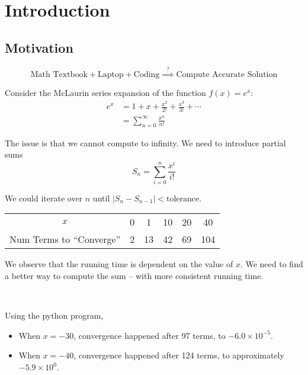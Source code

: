 \chapter{Introduction}

\section{Motivation}

\[
    \text{Math Textbook} + \text{Laptop} + \text{Coding} \overset{?}{\implies} \text{Compute Accurate Solution}
\]

Consider the McLaurin series expansion of the function \( f(x) = e^x \): \begin{align*}
    e^x & = 1 + x + \frac{x^2}{2!} + \frac{x^3}{3!} + \cdots \\
        & = \sum_{n=0}^{\infty} \frac{x^n}{n!}
\end{align*}

The issue is that we cannot compute to infinity. We need to introduce partial sums \[
    S_n = \sum_{i=0}^{n} \frac{x^i}{i!}
\]

We could iterate over \( n \) until \( \left| S_n - S_{n-1} \right| < \text{tolerance} \).

\begin{table}[ht!]
    \centering
    \begin{tabular}{c|ccccc}
        \( x \)                   & 0 & 1  & 10 & 20 & 40  \\
        Num Terms to ``Converge'' & 2 & 13 & 42 & 69 & 104 \\
    \end{tabular}
\end{table}

We observe that the running time is dependent on the value of \( x \). We need to find a better way to compute the sum -- with more consistent running time.

    {~~~}

Using the python program,
\begin{itemize}
    \item When \( x = -30 \), convergence happened after 97 terms, to \( -6.0 \times 10^{-5} \).
    \item When \( x = -40 \), convergence happened after 124 terms, to approximately \( -5.9 \times 10^0 \).
\end{itemize}

\begin{figure}[ht!]
    \centering
\end{figure}

